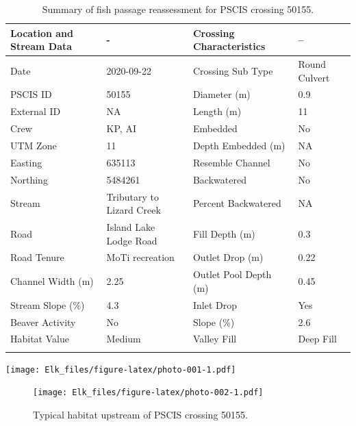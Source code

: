 \documentclass[
]{book}
\begin{document}
\begin{table}

\caption{\label{tab:tab-culvert-010}Summary of fish passage reassessment for PSCIS crossing 50155.}
\centering
\fontsize{11}{13}\selectfont
\begin{tabu} to 
\hline
Location and Stream Data & - & Crossing Characteristics & --\\
\hline
Date & 2020-09-22 & Crossing Sub Type & Round Culvert\\
\hline
PSCIS ID & 50155 & Diameter (m) & 0.9\\
\hline
External ID & NA & Length (m) & 11\\
\hline
Crew & KP, AI & Embedded & No\\
\hline
UTM Zone & 11 & Depth Embedded (m) & NA\\
\hline
Easting & 635113 & Resemble Channel & No\\
\hline
Northing & 5484261 & Backwatered & No\\
\hline
Stream & Tributary to Lizard Creek & Percent Backwatered & NA\\
\hline
Road & Island Lake Lodge Road & Fill Depth (m) & 0.3\\
\hline
Road Tenure & MoTi recreation & Outlet Drop (m) & 0.22\\
\hline
Channel Width (m) & 2.25 & Outlet Pool Depth (m) & 0.45\\
\hline
Stream Slope (\%) & 4.3 & Inlet Drop & Yes\\
\hline
Beaver Activity & No & Slope (\%) & 2.6\\
\hline
Habitat Value & Medium & Valley Fill & Deep Fill\\
\hline
{}\\
\end{tabu}
\end{table}

\texttt{[image: Elk\_files/figure-latex/photo-001-1.pdf]}

\begin{figure}
\centering
\texttt{[image: Elk\_files/figure-latex/photo-002-1.pdf]}
\caption{\label{fig:photo-002}Typical habitat upstream of PSCIS crossing 50155.}
\end{figure}

  
\end{document}
